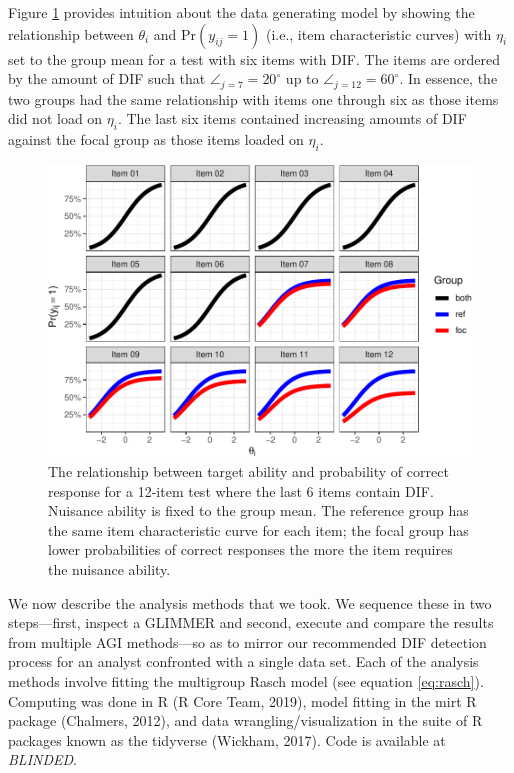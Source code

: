 \documentclass[
  english,
  man,floatsintext]{apa6}
\begin{document}
Figure \ref{fig:difmap} provides intuition about the data generating model by showing the relationship between \(\theta_i\) and \(\text{Pr}(y_{ij} = 1)\) (i.e., item characteristic curves) with \(\eta_i\) set to the group mean for a test with six items with DIF. The items are ordered by the amount of DIF such that \(\angle_{j = 7} = 20^\circ\) up to \(\angle_{j = 12} = 60^\circ\). In essence, the two groups had the same relationship with items one through six as those items did not load on \(\eta_i\). The last six items contained increasing amounts of DIF against the focal group as those items loaded on \(\eta_i\).

\begin{figure}[h]

{\centering \includegraphics[width=1\linewidth]{paper_apa_files/figure-latex/difmap-1} 

}

\caption{The relationship between target ability and probability of correct response for a 12-item test where the last 6 items contain DIF. Nuisance ability is fixed to the group mean. The reference group has the same item characteristic curve for each item; the focal group has lower probabilities of correct responses the more the item requires the nuisance ability.}\label{fig:difmap}
\end{figure}

We now describe the analysis methods that we took. We sequence these in two steps---first, inspect a GLIMMER and second, execute and compare the results from multiple AGI methods---so as to mirror our recommended DIF detection process for an analyst confronted with a single data set. Each of the analysis methods involve fitting the multigroup Rasch model (see equation \ref{eq:rasch}). Computing was done in R (R Core Team, 2019), model fitting in the mirt R package (Chalmers, 2012), and data wrangling/visualization in the suite of R packages known as the tidyverse (Wickham, 2017). Code is available at \emph{BLINDED}.
\end{document}
